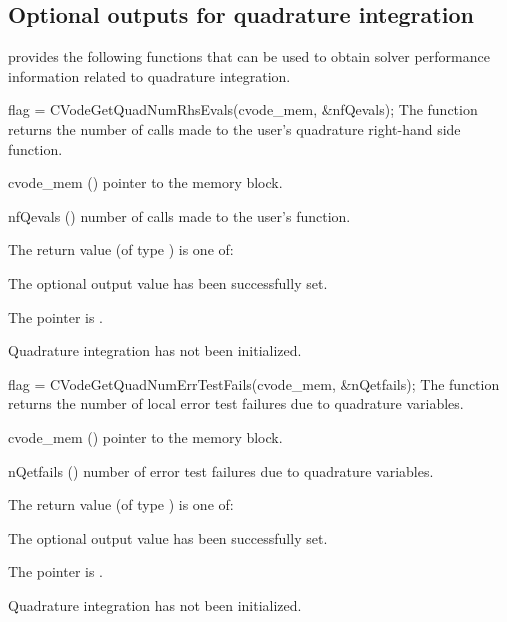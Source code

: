 
\subsection{Optional outputs for quadrature integration}\label{ss:quad_optional_output}

{\cvodes} provides the following functions that can be used to obtain solver
performance information related to quadrature integration.

{
  flag = CVodeGetQuadNumRhsEvals(cvode\_mem, \&nfQevals);
}
{
  The function  returns the
  number of calls made to the user's quadrature right-hand side function.
}
{
  \begin{args}
  \item[cvode\_mem] ()
    pointer to the {\cvodes} memory block.
  \item[nfQevals] ()
    number of calls made to the user's  function.
  \end{args}
}
{
  The return value  (of type ) is one of:
  \begin{args}
  \item[\Id{CV\_SUCCESS}]
    The optional output value has been successfully set.
  \item[\Id{CV\_MEM\_NULL}]
    The  pointer is .
  \item[\Id{CV\_NO\_QUAD}]
    Quadrature integration has not been initialized.
  \end{args}
}
{}
{
  flag = CVodeGetQuadNumErrTestFails(cvode\_mem, \&nQetfails);
}
{
  The function  returns the
  number of local error test failures due to quadrature variables.
}
{
  \begin{args}
  \item[cvode\_mem] ()
    pointer to the {\cvodes} memory block.
  \item[nQetfails] ()
    number of error test failures due to quadrature variables.
  \end{args}
}
{
  The return value  (of type ) is one of:
  \begin{args}
  \item[\Id{CV\_SUCCESS}]
    The optional output value has been successfully set.
  \item[\Id{CV\_MEM\_NULL}]
    The  pointer is .
  \item[\Id{CV\_NO\_QUAD}]
    Quadrature integration has not been initialized.
  \end{args}
}
